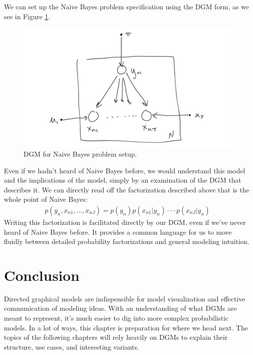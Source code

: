 We can set up the Naive Bayes problem specification using the DGM form, as we see in Figure \ref{fig:naive-bayes}.
\begin{figure}
	\centering
	\includegraphics[width=0.5\paperwidth]{../GraphicalModels/fig/naive-bayes-dgm.png}
    \caption{DGM for Naive Bayes problem setup.}
	\label{fig:naive-bayes}
\end{figure}

Even if we hadn't heard of Naive Bayes before, we would understand this model and the implications of the model, simply by an examination of the DGM that describes it. We can directly read off the factorization described above that is the whole point of Naive Bayes:
\begin{align*}
	p(y_n, x_{n1}, ..., x_{nJ}) = p(y_n) p(x_{n1} | y_n) \cdot \cdot \cdot p(x_{nJ} | y_n)
\end{align*}
Writing this factorization is facilitated directly by our DGM, even if we've never heard of Naive Bayes before. It provides a common language for us to move fluidly between detailed probability factorizations and general modeling intuition.

\section{Conclusion}
Directed graphical models are indispensible for model visualization and effective communication of modeling ideas. With an understanding of what DGMs are meant to represent, it's much easier to dig into more complex probabilistic models. In a lot of ways, this chapter is preparation for where we head next. The topics of the following chapters will rely heavily on DGMs to explain their structure, use cases, and interesting variants.